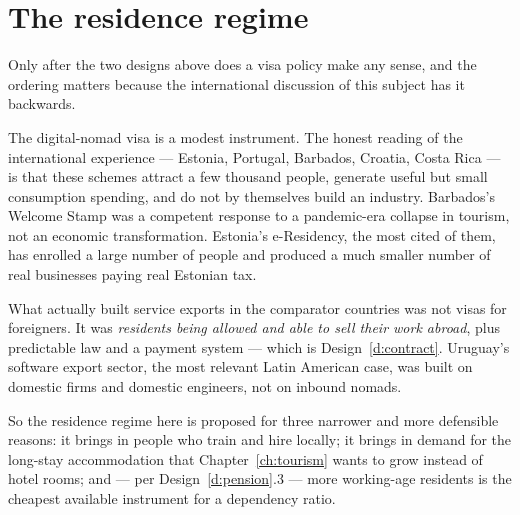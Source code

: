 \section{The residence regime}

Only after the two designs above does a visa policy make any sense, and the
ordering matters because the international discussion of this subject has it
backwards.

The digital-nomad visa is a modest instrument. The honest reading of the
international experience --- Estonia, Portugal, Barbados, Croatia, Costa Rica ---
is that these schemes attract a few thousand people, generate useful but small
consumption spending, and do not by themselves build an industry. Barbados's
Welcome Stamp was a competent response to a pandemic-era collapse in tourism, not
an economic transformation. Estonia's e-Residency, the most cited of them, has
enrolled a large number of people and produced a much smaller number of real
businesses paying real Estonian tax.

What actually built service exports in the comparator countries was not visas for
foreigners. It was \emph{residents being allowed and able to sell their work
abroad}, plus predictable law and a payment system --- which is
Design~\ref{d:contract}. Uruguay's software export sector, the most relevant Latin
American case, was built on domestic firms and domestic engineers, not on
inbound nomads.

So the residence regime here is proposed for three narrower and more defensible
reasons: it brings in people who train and hire locally; it brings in demand for
the long-stay accommodation that Chapter~\ref{ch:tourism} wants to grow instead
of hotel rooms; and --- per Design~\ref{d:pension}.3 --- more working-age
residents is the cheapest available instrument for a dependency ratio.

